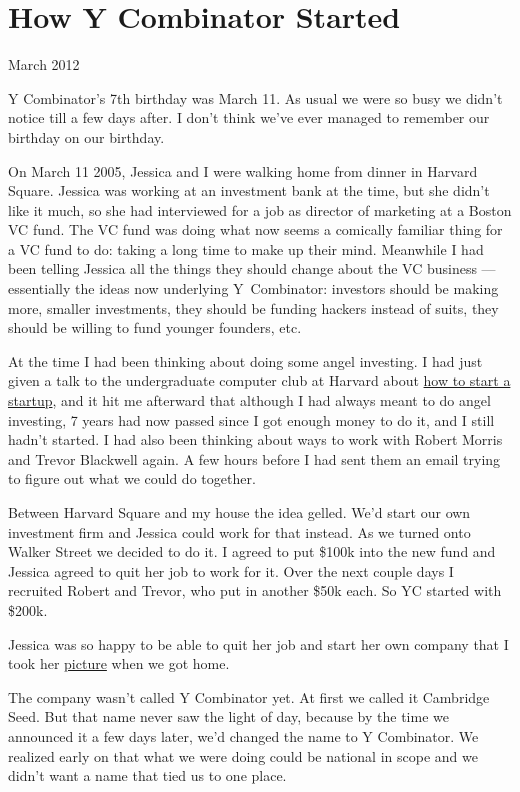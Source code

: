 \chapter{How Y Combinator Started}

March 2012

Y Combinator's 7th birthday was March 11. As usual we were so busy we
didn't notice till a few days after. I don't think we've ever managed to
remember our birthday on our birthday.

On March 11 2005, Jessica and I were walking home from dinner in Harvard
Square. Jessica was working at an investment bank at the time, but she
didn't like it much, so she had interviewed for a job as director of
marketing at a Boston VC fund. The VC fund was doing what now seems a
comically familiar thing for a VC fund to do: taking a long time to make
up their mind. Meanwhile I had been telling Jessica all the things they
should change about the VC business --- essentially the ideas now
underlying Y~Combinator: investors should be making more, smaller
investments, they should be funding hackers instead of suits, they
should be willing to fund younger founders, etc.

At the time I had been thinking about doing some angel investing. I had
just given a talk to the undergraduate computer club at Harvard about
\href{start.html}{how to start a startup}, and it hit me afterward that
although I had always meant to do angel investing, 7 years had now
passed since I got enough money to do it, and I still hadn't started. I
had also been thinking about ways to work with Robert Morris and Trevor
Blackwell again. A few hours before I had sent them an email trying to
figure out what we could do together.

Between Harvard Square and my house the idea gelled. We'd start our own
investment firm and Jessica could work for that instead. As we turned
onto Walker Street we decided to do it. I agreed to put \$100k into the
new fund and Jessica agreed to quit her job to work for it. Over the
next couple days I recruited Robert and Trevor, who put in another \$50k
each. So YC started with \$200k.

Jessica was so happy to be able to quit her job and start her own
company that I took her
\href{https://web.archive.org/web/20170609055553/http://www.ycombinator.com/yc05.html}{picture}
when we got home.

The company wasn't called Y Combinator yet. At first we called it
Cambridge Seed. But that name never saw the light of day, because by the
time we announced it a few days later, we'd changed the name to Y
Combinator. We realized early on that what we were doing could be
national in scope and we didn't want a name that tied us to one place.

